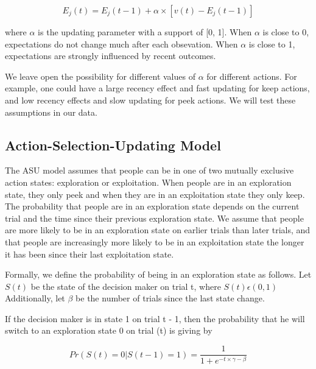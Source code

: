 \documentclass[a4paper,doc,natbib,floatsintext]{apa6}\usepackage[]{graphicx}\usepackage[]{color}
\begin{document}
\begin{center}
\begin{equation}
\label{eq:updating}

E_{j}(t)=E_{j}(t-1)+\alpha \times [v(t) - E_{j}(t-1)]

\end{equation}
\end{center}

where $\alpha$ is the updating parameter with a support of [0, 1]. When $\alpha$ is close to 0, expectations do not change much after each obsevation. When $\alpha$ is close to 1, expectations are strongly influenced by recent outcomes.

We leave open the possibility for different values of $\alpha$ for different actions. For example, one could have a large recency effect and fast updating for keep actions, and low recency effects and slow updating for peek actions. We will test these assumptions in our data.

\subsection{Action-Selection-Updating Model}


The ASU model assumes that people can be in one of two mutually exclusive action states: exploration or exploitation. When people are in an exploration state, they only peek and when they are in an exploitation state they only keep. The probability that people are in an exploration state depends on the current trial and the time since their previous exploration state. We assume that people are more likely to be in an exploration state on earlier trials than later trials, and that people are increasingly more likely to be in an exploitation state the longer it has been since their last exploitation state.

Formally, we define the probability of being in an exploration state as follows. Let $S(t)$ be the state of the decision maker on trial t, where $S(t) \epsilon (0, 1)$ Additionally, let $\beta$ be the number of trials since the last state change.

If the decision maker is in state 1 on trial t - 1, then the probability that he will switch to an exploration state 0 on trial (t) is giving by

\begin{center}
\begin{equation}
\label{eq:modeswitch}

Pr(S(t)=0|S(t-1) = 1)= \frac{1}{1 + e^{-t \times \gamma - \beta}}

\end{equation}
\end{center}
\end{document}
